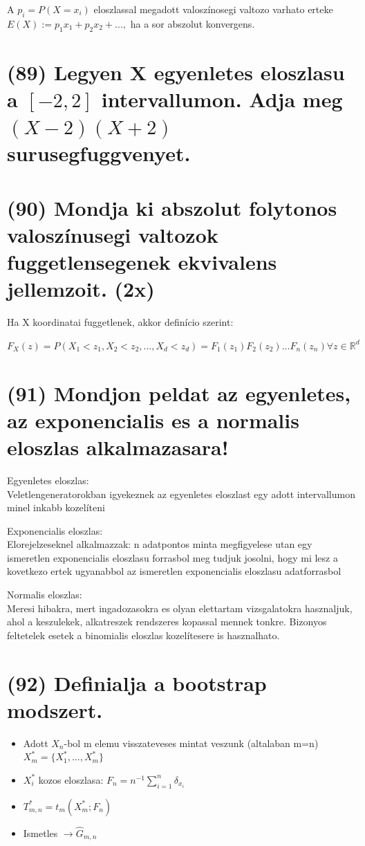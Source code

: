 \documentclass[12p]{article}
\begin{document}
A $p_i =P (X=x_i)$ eloszlassal megadott valoszínosegi valtozo varhato erteke $E(X):= p_1x_1+ p_2x_2 +...,$ ha a sor abszolut konvergens.

\section{(89)  Legyen X egyenletes eloszlasu a $[-2,2]$ intervallumon. Adja meg $(X - 2)(X + 2)$ surusegfuggvenyet.}

\section{(90) Mondja ki abszolut folytonos valoszínusegi valtozok fuggetlensegenek ekvivalens jellemzoit. (2x)}

Ha X koordinatai fuggetlenek, akkor definício szerint:

$F_X(z) = P(X_1<z_1, X_2<z_2, ..., X_d<z_d) = F_1(z_1)F_2(z_2)...F_n(z_n) \forall z \in \mathbb{R}^d$

\section{(91) Mondjon peldat az egyenletes, az exponencialis es a normalis eloszlas alkalmazasara!}

Egyenletes eloszlas:\\
Veletlengeneratorokban igyekeznek az egyenletes eloszlast egy adott intervallumon minel inkabb kozelíteni

Exponencialis eloszlas:\\
Elorejelzeseknel alkalmazzak: n adatpontos minta megfigyelese utan egy ismeretlen exponencialis eloszlasu forrasbol meg tudjuk josolni, hogy mi lesz a kovetkezo ertek ugyanabbol az ismeretlen exponencialis eloszlasu adatforrasbol

Normalis eloszlas:\\
Meresi hibakra, mert ingadozasokra es olyan elettartam vizsgalatokra hasznaljuk, ahol a keszulekek, alkatreszek rendszeres kopassal mennek tonkre. Bizonyos feltetelek esetek a binomialis eloszlas kozelítesere is hasznalhato.

\section{(92) Definialja a bootstrap modszert.}

\begin{itemize}
	\item Adott $X_n$-bol m elemu visszateveses mintat veszunk (altalaban m=n) \quad $X^{*}_m = \{X^{*}_1,...,X^{*}_m\}$
	\item $X_i^{*}$ kozos eloszlasa: $F_n = n^{-1} \sum^n_{i=1} \delta_{x_i}$
	\item $T^{*}_{m,n} = t_m (X^{*}_m;F_n)$
	\item Ismetles $\rightarrow \hat{G}_{m,n}$
	
\end{itemize}
\end{document}
